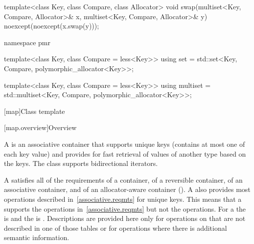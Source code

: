 \begin{codeblock}
{  template<class Key, class Compare, class Allocator>
    void swap(multiset<Key, Compare, Allocator>& x,
              multiset<Key, Compare, Allocator>& y)
      noexcept(noexcept(x.swap(y)));

  namespace pmr {
    template<class Key, class Compare = less<Key>>
      using set = std::set<Key, Compare, polymorphic_allocator<Key>>;

    template<class Key, class Compare = less<Key>>
      using multiset = std::multiset<Key, Compare, polymorphic_allocator<Key>>;
  }
}
\end{codeblock}

[map]{Class template }

[map.overview]{Overview}

%
\pnum
A  is an associative container that
supports unique keys (contains at most one of each key value) and
provides for fast retrieval of values of another type  based
on the keys. The  class supports bidirectional iterators.

\pnum
A
satisfies all of the requirements of a container, of a reversible container, of
an associative container, and of an allocator-aware container ().
A
also provides most operations described in~\ref{associative.reqmts}
for unique keys.
This means that a
supports the
operations in~\ref{associative.reqmts}
but not the
operations.
For a
the
is
and the
is
.
Descriptions are provided here only for operations on
that are not described in one of those tables
or for operations where there is additional semantic information.

